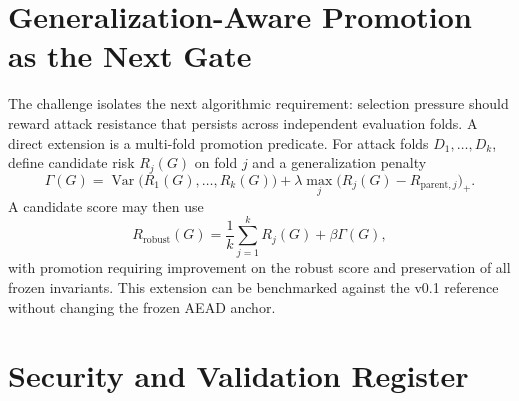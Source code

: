 \chapter[Generalization-Aware Promotion as the Next Gate]{Generalization-Aware Promotion\\as the Next Gate}
The challenge isolates the next algorithmic requirement: selection pressure should reward attack resistance that persists across independent evaluation folds. A direct extension is a multi-fold promotion predicate. For attack folds $D_1,\ldots,D_k$, define candidate risk $R_j(G)$ on fold $j$ and a generalization penalty
\begin{equation}
\Gamma(G)=\operatorname{Var}\bigl(R_1(G),\ldots,R_k(G)\bigr)+\lambda\max_j\bigl(R_j(G)-R_{\mathrm{parent},j}\bigr)_+.
\end{equation}
A candidate score may then use
\begin{equation}
R_{\mathrm{robust}}(G)=\frac1k\sum_{j=1}^{k}R_j(G)+\beta\Gamma(G),
\end{equation}
with promotion requiring improvement on the robust score and preservation of all frozen invariants. This extension can be benchmarked against the v0.1 reference without changing the frozen AEAD anchor.

\chapter{Security and Validation Register}
